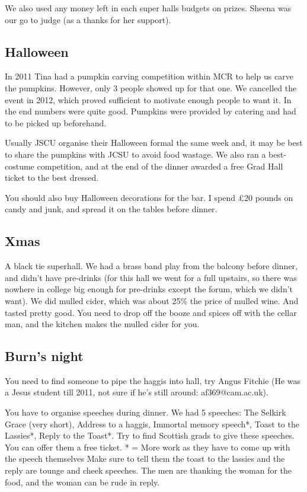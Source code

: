 \documentclass[9.5pt]{article} %
\begin{document}
We also used any money left in each super halls budgets on prizes. Sheena was our go to judge (as a thanks for her support).



\subsection{Halloween} %
In 2011 Tina had a pumpkin carving competition within MCR to help us carve the pumpkins. However, only 3 people showed up for that one. We cancelled the event in  2012, which proved sufficient to motivate enough people to want it. In the end numbers were quite good. Pumpkins were provided by catering and had to be picked up beforehand.
							
Usually JSCU organise their Halloween formal the same week and, it may be best to share the pumpkins with JCSU to avoid food wastage.							
We also ran a best-costume competition, and at the end of the dinner awarded a free Grad Hall ticket to the best dressed.
							
You should also buy Halloween decorations for the bar. I spend £20 pounds on candy and junk, and spread it on the tables before dinner.

\subsection{Xmas} %
A black tie superhall. We had a brass band play from the balcony before dinner, and didn't have pre-drinks (for this hall we went for a full upstairs, so there was nowhere in college big enough for pre-drinks except the forum, which we didn't want). We did mulled cider, which was about 25\% the price of mulled wine. And tasted pretty good. You need to drop off the booze and spices off with the cellar man, and the kitchen makes the mulled cider for you.

\subsection{Burn's night} %
You need to find someone to pipe the haggis into hall, try Angus Fitchie (He was a Jesus student till 2011, not sure if he’s still around: af369@cam.ac.uk).
					
You have to organise speeches during dinner. We had 5 speeches: The Selkirk Grace (very short), Address to a haggis, Immortal memory speech*, Toast to the Lassies*, Reply to the Toast*. Try to find Scottish grads to give these speeches. You can offer them a free ticket.
* = More work as they have to come up with the speech themselves
Make sure to tell them the toast to the lassies and the reply are tounge and cheek speeches. The men are thanking the woman for the food, and the woman can be rude in reply.
					
\end{document}

